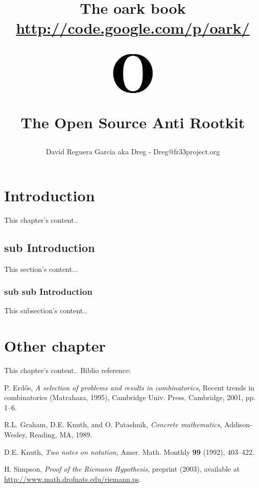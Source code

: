 \documentclass[12pt,a4paper,english]{book}
\begin{document}
\title{The oark book \href{http://code.google.com/p/oark/}{http://code.google.com/p/oark/} \newline\begin{figure} [h]
\begin {center}
\includegraphics[width=0.2\textwidth]{oark.jpg}
\end {center}
\end{figure} \newline The Open Source Anti Rootkit}
\author{David Reguera Garcia aka Dreg - Dreg@fr33project.org}
\maketitle
\date{}
\tableofcontents

\chapter{Introduction}
This chapter's content..

\section{sub Introduction}
This section's content...

\subsection{sub sub Introduction}
This subsection's content..

\chapter{Other chapter}
This chapter's content..
Biblio reference: \cite{Erdos01}

\begin{thebibliography}{9}


 P. Erd\H os, \emph{A selection of problems and
results in combinatorics}, Recent trends in combinatorics (Matrahaza,
1995), Cambridge Univ. Press, Cambridge, 2001, pp. 1--6.

R.L. Graham, D.E. Knuth, and O. Patashnik, \emph{Concrete
mathematics}, Addison-Wesley, Reading, MA, 1989.

 D.E. Knuth, \emph{Two notes on notation}, Amer.
Math. Monthly \textbf{99} (1992), 403--422.

 H. Simpson, \emph{Proof of the Riemann
Hypothesis},  preprint (2003), available at
\url{http://www.math.drofnats.edu/riemann.ps}.

\end{thebibliography}
\end{document}
